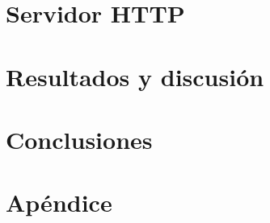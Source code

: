 \documentclass[twoside,spanish,a4paper,12pt]{tfg}
\begin{document}
\chapter{Servidor HTTP}


\chapter{Resultados y discusión}


%
\chapter{Conclusiones}




\pagestyle{appendix}

\appendix
\chapter{Apéndice}




\end{document}

